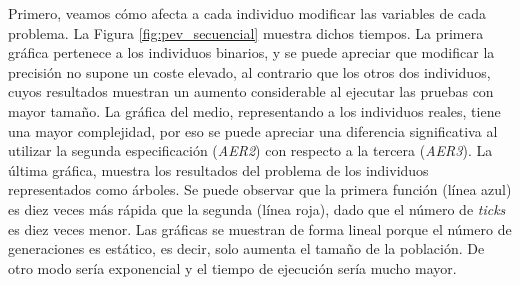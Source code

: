 			
		Primero, veamos cómo afecta a cada individuo modificar las variables de cada problema. La Figura \ref{fig:pev_secuencial} muestra dichos tiempos. La primera gráfica pertenece a los individuos binarios, y se puede apreciar que modificar la precisión no supone un coste elevado, al contrario que los otros dos individuos, cuyos resultados muestran un aumento considerable al ejecutar las pruebas con mayor tamaño. La gráfica del medio, representando a los individuos reales, tiene una mayor complejidad, por eso se puede apreciar una diferencia significativa al utilizar la segunda especificación (\textit{AER2}) con respecto a la tercera (\textit{AER3}). La última gráfica, muestra los resultados del problema de los individuos representados como árboles. Se puede observar que la primera función (línea azul) es diez veces más rápida que la segunda (línea roja), dado que el número de \textit{ticks} es diez veces menor. Las gráficas se muestran de forma lineal porque el número de generaciones es estático, es decir, solo aumenta el tamaño de la población. De otro modo sería exponencial y el tiempo de ejecución sería mucho mayor.
	

	
	
